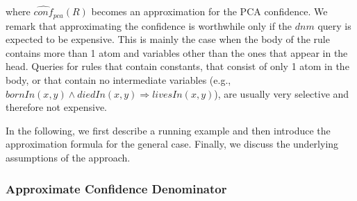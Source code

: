 {\noindent where $\widehat{conf}_{pca}(R)$ becomes an approximation for the PCA confidence.
We remark that approximating the confidence
is worthwhile only if the $dnm$ query is expected to be expensive.
This is mainly the case when the body of the rule contains more than 1 atom and variables other than the ones that appear in the head. %
Queries for rules that contain constants, that consist of only 1 atom in the body, or that contain no intermediate variables (e.g., $bornIn(x,y) \wedge diedIn(x,y) \Rightarrow livesIn(x,y)$), are usually very selective and therefore not expensive.

In the following, we first describe a running example  and then introduce the approximation formula for the general case.
Finally, we discuss the underlying assumptions of the approach.

\subsubsection{Approximate Confidence Denominator}

}
